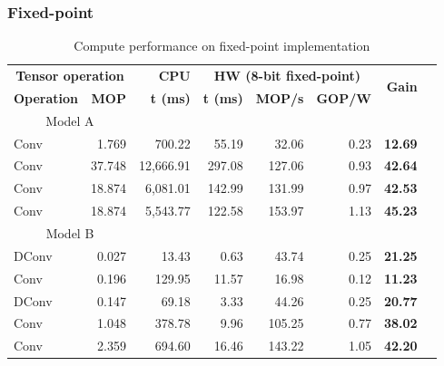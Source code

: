 \subsubsection{Fixed-point}
\begin{table}[!htp]\centering
	\caption{Compute performance on fixed-point implementation}\label{tab:performance_fixed_point }
	\scriptsize
	\begin{tabular}{lrrrrrrr}\toprule
		\multicolumn{2}{c}{\textbf{Tensor operation}} &\textbf{CPU} &\multicolumn{3}{c}{\textbf{HW (8-bit fixed-point)}} &\multirow{2}{*}{\textbf{Gain}} \\\cmidrule{1-6}
		\textbf{Operation} &\textbf{MOP} &\textbf{t (ms)} &\textbf{t (ms)} &\textbf{MOP/s} &\textbf{GOP/W} & \\\midrule
		\multicolumn{2}{c}{Model A} & & & & & \\
		Conv &1.769 &700.22 &55.19 &32.06 &0.23 &\textbf{12.69} \\
		Conv &37.748 &12,666.91 &297.08 &127.06 &0.93 &\textbf{42.64} \\
		Conv &18.874 &6,081.01 &142.99 &131.99 &0.97 &\textbf{42.53} \\
		Conv &18.874 &5,543.77 &122.58 &153.97 &1.13 &\textbf{45.23} \\
		\multicolumn{2}{c}{Model B} & & & & & \\
		DConv &0.027 &13.43 &0.63 &43.74 &0.25 &\textbf{21.25} \\
		Conv &0.196 &129.95 &11.57 &16.98 &0.12 &\textbf{11.23} \\
		DConv &0.147 &69.18 &3.33 &44.26 &0.25 &\textbf{20.77} \\
		Conv &1.048 &378.78 &9.96 &105.25 &0.77 &\textbf{38.02} \\
		Conv &2.359 &694.60 &16.46 &143.22 &1.05 &\textbf{42.20} \\
		\bottomrule
	\end{tabular}
\end{table}



